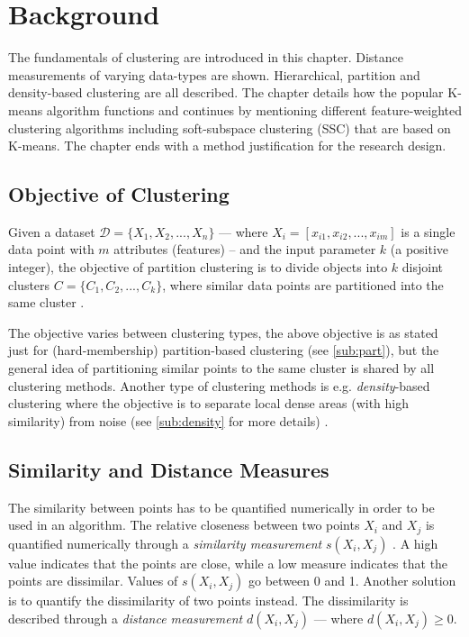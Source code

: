 \documentclass[../report.tex]{subfiles}
\begin{document}
\chapter{Background}
The fundamentals of clustering are introduced in this chapter. Distance measurements of varying data-types are shown. Hierarchical, partition and density-based clustering are all described. The chapter details how the popular K-means algorithm functions and continues by mentioning different feature-weighted clustering algorithms including soft-subspace clustering (SSC) that are based on K-means. The chapter ends with a method justification for the research design.

\section{Objective of Clustering}
Given a dataset $\mathcal{D} = \{X_{ 1 }, X_{ 2 },..., X_{ n } \}$ --- where $X_i = [x_{i1}, x_{i2},...,x_{im} ]$ is a single data point with $m$ attributes (features) -- and the input parameter $k$ (a positive integer), the objective of partition clustering is to divide objects into $k$ disjoint clusters ${C} = \{C_1, C_2,..., C_k \}$, where similar data points are partitioned into the same cluster \cite{Huang97clusteringlarge}.

The objective varies between clustering types, the above objective is as stated just for (hard-membership) partition-based clustering (see \cref{sub:part}), but the general idea of partitioning similar points to the same cluster is shared by all clustering methods. Another type of clustering methods is e.g. \textit{density}-based clustering where the objective is to separate local dense areas (with high similarity) from noise (see \cref{sub:density} for more details) \cite{Ester1996}.

\section{Similarity and Distance Measures}
The similarity between points has to be quantified numerically in order to be used in an algorithm. The relative closeness between two points $X_i$ and $X_j$ is quantified numerically through a \textit{similarity measurement} $s(X_i, X_j)$ \cite{diday1976clustering}. A high value indicates that the points are close, while a low measure indicates that the points are dissimilar. Values of $s(X_i, X_j)$ go between 0 and 1. Another solution is to quantify the dissimilarity of two points instead. The dissimilarity is described through a \textit{distance measurement} $d(X_i, X_j)$ --- where $d(X_i, X_j) \geq 0$.
\end{document}
